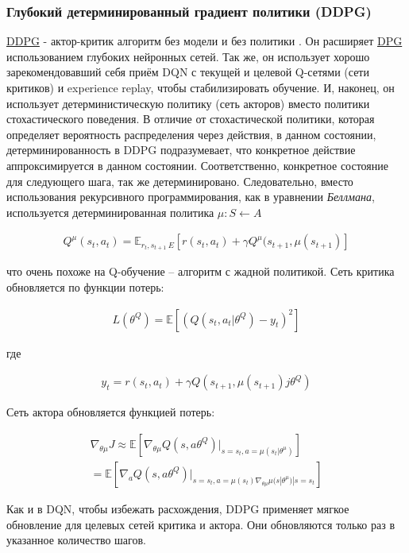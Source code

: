 \subsubsection{Глубокий детерминированный градиент политики (DDPG)}

\hyperref[acr:ddpg]{DDPG} - актор-критик алгоритм без модели и без политики \cite{lillicrap2015continuous}. Он расширяет \hyperref[acr:dpg]{DPG} использованием глубоких нейронных сетей. Так же, он использует хорошо зарекомендовавший себя приём DQN с текущей и целевой Q-сетями (сети критиков) и experience replay, чтобы стабилизировать обучение. И, наконец, он использует детерминистическую политику (сеть акторов) вместо политики стохастического поведения.
В отличие от стохастической политики, которая определяет вероятность распределения через действия, в данном состоянии, детерминированность в DDPG подразумевает, что конкретное действие аппроксимируется в данном состоянии. Соответственно, конкретное состояние для следующего шага, так же детерминировано.
Следовательно, вместо использования рекурсивного программирования, как в уравнении {\itshape Беллмана}, используется детерминированная политика $\mu : S \leftarrow A$ \cite{lillicrap2015continuous}

\begin{equation}
	\label{eq:ch1-ddpg-1}
	\begin{multlined}
		Q^\mu (s_t, a_t) = \mathbb{E}_{r_t, s_{t+1}~E}[r(s_t, a_t) + \gamma Q^\mu(s_{t+1}, \mu(s_{t+1})]
	\end{multlined}
\end{equation}

что очень похоже на Q-обучение – алгоритм с жадной политикой. Сеть критика обновляется по функции потерь:

\begin{equation}
	\label{eq:ch1-ddpg-1}
	\begin{multlined}
		L(\theta^Q) = \mathbb{E}[(Q(s_t, a_t|\theta^Q) - y_t)^2]
	\end{multlined}
\end{equation}

где

\begin{equation}
	\label{eq:ch1-ddpg-3}
	\begin{multlined}
		y_t = r(s_t, a_t) + \gamma Q(s_{t+1}, \mu(s_{t+1})j\theta^Q)
	\end{multlined}
\end{equation}

Сеть актора обновляется функцией потерь:

\begin{equation}
	\label{eq:ch1-ddpg-4}
	\begin{multlined}
		\nabla_{\theta \mu} J \approx \mathbb{E}[\nabla_{\theta \mu} Q(s, a \theta^Q)|_{s=s_t,a=\mu(s_t|\theta^\mu)}] \\
		= \mathbb{E}[\nabla_a Q(s, a \theta^Q)|_{s=s_t,a=\mu(s_t) \nabla_{\theta \mu} \mu (s|\theta^\mu)|s=s_t}]
	\end{multlined}
\end{equation}

Как и в DQN, чтобы избежать расхождения, DDPG применяет мягкое обновление для целевых сетей критика и актора. Они обновляются только раз в указанное количество шагов.

